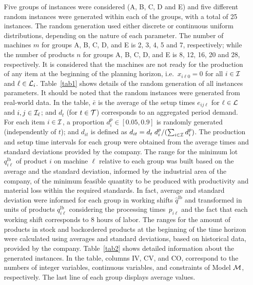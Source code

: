 \documentclass[11pt]{article}
\begin{document}
Five groups of instances were considered (A, B, C, D and E) and five different random instances were generated within each of the groups, with a total of 25 instances.  The random generation used either discrete or continuous uniform distributions, depending on the nature of each parameter. The number of machines $m$ for groups A, B, C, D, and E is 2, 3, 4, 5 and 7, respectively; while the number of products $n$ for groups A, B, C, D, and E is 8, 12, 16, 20 and 28, respectively. It is considered that the machines are not ready for the production of any item at the beginning of the planning horizon, i.e.\ $x_{i \ell 0}=0$ for all $i \in {\cal I}$ and $\ell \in {\cal L}_i$. Table~\ref{tab1} shows details of the random generation of all instances parameters. It should be noted that the random instances were generated from real-world data. In the table, $\bar e$ is the average of the setup times $e_{ij\ell}$ for $\ell \in {\cal L}$ and $i,j \in {\cal I}_\ell$; and $d_t$ (for $t \in {\cal T}$) corresponds to an aggregated period demand. For each item $i \in {\cal I}$, a proportion $d_{i}^p \in [0.05, 0.9]$ is randomly generated (independently of $t$); and $d_{it}$ is defined as $d_{it} = d_t \; d_i^p / ( \sum_{i \in {\cal I}} d_i^p )$. The production and setup time intervals for each group were obtained from the average times and standard deviations provided by the company. The range for the minimum lot $q_{i\ell}^{\mathrm{lb}}$ of product $i$ on machine $\ell$ relative to each group was built based on the average and the standard deviation, informed by the industrial area of the company, of the minimum feasible quantity to be produced with productivity and material loss within the required standards. In fact, average and standard deviation were informed for each group in working shifts $\hat q^{\mathrm{lb}}$ and transformed in units of products $q_{i\ell}^{\mathrm{lb}}$ considering the processing times~$p_{i\ell}$ and the fact that each working shift corresponds to 8 hours of labor. The ranges for the amount of products in stock and backordered products at the beginning of the time horizon were calculated using averages and standard deviations, based on historical data, provided by the company. Table~\ref{tab2} shows detailed information about the generated instances. In the table, columns IV, CV, and CO, correspond to the numbers of integer variables, continuous variables, and constraints of Model ${\cal M}$, respectively. The last line of each group displays average values. 
\end{document}

